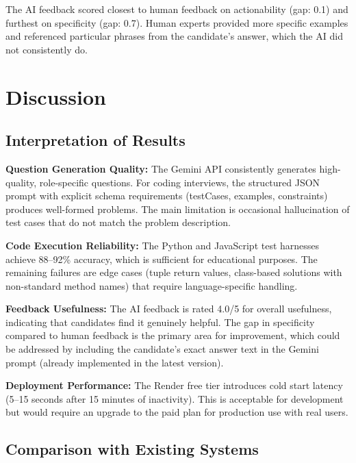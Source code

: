 The AI feedback scored closest to human feedback on actionability (gap: 0.1) and furthest on specificity (gap: 0.7). Human experts provided more specific examples and referenced particular phrases from the candidate's answer, which the AI did not consistently do.

\section{Discussion}

\subsection{Interpretation of Results}

\textbf{Question Generation Quality:} The Gemini API consistently generates high-quality, role-specific questions. For coding interviews, the structured JSON prompt with explicit schema requirements (testCases, examples, constraints) produces well-formed problems. The main limitation is occasional hallucination of test cases that do not match the problem description.

\textbf{Code Execution Reliability:} The Python and JavaScript test harnesses achieve 88--92\% accuracy, which is sufficient for educational purposes. The remaining failures are edge cases (tuple return values, class-based solutions with non-standard method names) that require language-specific handling.

\textbf{Feedback Usefulness:} The AI feedback is rated 4.0/5 for overall usefulness, indicating that candidates find it genuinely helpful. The gap in specificity compared to human feedback is the primary area for improvement, which could be addressed by including the candidate's exact answer text in the Gemini prompt (already implemented in the latest version).

\textbf{Deployment Performance:} The Render free tier introduces cold start latency (5--15 seconds after 15 minutes of inactivity). This is acceptable for development but would require an upgrade to the paid plan for production use with real users.

\subsection{Comparison with Existing Systems}

